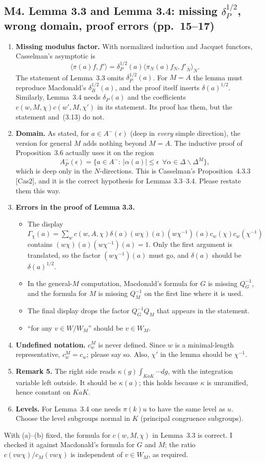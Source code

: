 \documentclass[11pt]{article}
\newcommand{\ip}[1]{\langle #1\rangle}
\begin{document}
\subsection*{M4. Lemma 3.3 and Lemma 3.4: missing $\delta_P^{1/2}$, wrong domain, proof errors (pp.~15--17)}
\begin{enumerate}[label=(\alph*)]
\item \textbf{Missing modulus factor.} With normalized induction and Jacquet functors, Casselman's asymptotic is
\[\ip{\pi(a)f,f'}=\delta_P^{1/2}(a)\ip{\pi_N(a)f_N,f'_{\bar N}}_N.\]
The statement of Lemma~3.3 omits $\delta_P^{1/2}(a)$. For $M=A$ the lemma must reproduce Macdonald's $\delta_B^{1/2}(a)$, and the proof itself inserts $\delta(a)^{1/2}$. Similarly, Lemma~3.4 needs $\delta_P(a)$ and the coefficients $c(w,M,\chi)c(w',M,\chi')$ in its statement. Its proof has them, but the statement and~(3.13) do not.
\item \textbf{Domain.} As stated, for $a\in A^-(\epsilon)$ (deep in \emph{every} simple direction), the version for general $M$ adds nothing beyond $M=A$. The inductive proof of Proposition~3.6 actually uses it on the region
\[A^-_{P}(\epsilon)=\{a\in A^-:\ |\alpha(a)|\le\epsilon\ \ \forall\alpha\in\Delta\smallsetminus\Delta^M\},\]
which is deep only in the $N$-directions. This is Casselman's Proposition~4.3.3 [Cas2], and it is the correct hypothesis for Lemmas 3.3--3.4. Please restate them this way.
\item \textbf{Errors in the proof of Lemma 3.3.}
\begin{itemize}
\item The display $\Gamma_\chi(a)=\sum_w c(w,A,\chi)\delta(a)(w\chi)(a)(w\chi^{-1})(a)c_w(\chi)c_w(\chi^{-1})$ contains $(w\chi)(a)(w\chi^{-1})(a)=1$. Only the first argument is translated, so the factor $(w\chi^{-1})(a)$ must go, and $\delta(a)$ should be $\delta(a)^{1/2}$.
\item In the general-$M$ computation, Macdonald's formula for $G$ is missing $Q_G^{-1}$, and the formula for $M$ is missing $Q_M^{-1}$ on the first line where it is used.
\item The final display drops the factor $Q_G^{-1}Q_M$ that appears in the statement.
\item ``for any $v\in W/W_M$'' should be $v\in W_M$.
\end{itemize}
\item \textbf{Undefined notation.} $c^M_w$ is never defined. Since $w$ is a minimal-length representative, $c^M_w=c_w$; please say so. Also, $\chi'$ in the lemma should be $\chi^{-1}$.
\item \textbf{Remark 5.} The right side reads $\kappa(g)\int_{KaK}\cdots dg$, with the integration variable left outside. It should be $\kappa(a)$; this holds because $\kappa$ is unramified, hence constant on $KaK$.
\item \textbf{Levels.} For Lemma~3.4 one needs $\pi(k)u$ to have the same level as $u$. Choose the level subgroups normal in $K$ (principal congruence subgroups).
\end{enumerate}
With (a)--(b) fixed, the formula for $c(w,M,\chi)$ in Lemma~3.3 is correct. I checked it against Macdonald's formula for $G$ and $M$; the ratio $c(vw\chi)/c_M(vw\chi)$ is independent of $v\in W_M$, as required.
\end{document}
